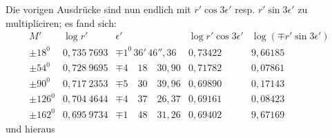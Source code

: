 Die vorigen Ausdrücke sind nun endlich mit \(r'\cos3\epsilon'\) resp. \(r'\sin3\epsilon'\) zu multipliciren; es fand sich:
\begingroup\footnotesize\setlength{\arraycolsep}{4pt}
\[
\begin{array}{r|r|r|r|r}
M'&\log r'&\epsilon'&\log r'\cos3\epsilon'&\log(\mp r'\sin3\epsilon')\\\hline
\pm18^{0}&0{,}735\ 7693&\mp1^{0}\,36'\,46''{,}36&0{,}73422&9{,}66185\\
\pm54^{0}&0{,}728\ 9695&\mp4\quad18\quad30{,}90&0{,}71782&0{,}07861\\
\pm90^{0}&0{,}717\ 2353&\mp5\quad30\quad39{,}96&0{,}69890&0{,}17143\\
\pm126^{0}&0{,}704\ 4644&\mp4\quad37\quad26{,}37&0{,}69161&0{,}08423\\
\pm162^{0}&0{,}695\ 9734&\mp1\quad48\quad31{,}26&0{,}69402&9{,}67169
\end{array}
\]
\endgroup
und hieraus

